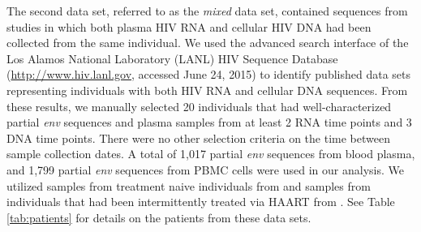 \documentclass[12pt]{article}
\begin{document}
The second data set, referred to as the {\em mixed} data set, contained sequences from studies in which both plasma HIV RNA and cellular HIV DNA had been collected from the same individual.
We used the advanced search interface of the Los Alamos National Laboratory (LANL) HIV Sequence Database (\url{http://www.hiv.lanl.gov}, accessed June 24, 2015) to identify published data sets representing individuals with both HIV RNA and cellular DNA sequences.
From these results, we manually selected 20 individuals that had well-characterized partial {\em env} sequences and plasma samples from at least 2 RNA time points and 3 DNA time points. 
There were no other selection criteria on the time between sample collection dates. 
A total of 1,017 partial {\em env} sequences from blood plasma, and 1,799 partial {\em env} sequences from PBMC cells were used in our analysis. 
We utilized samples from treatment naive individuals from \cite{Shankarappa99, Novitsky09} and samples from individuals that had been intermittently treated via HAART from \cite{Llewellyn06,Fischer04}. 
See Table \ref{tab:patients} for details on the patients from these data sets.
\end{document}
